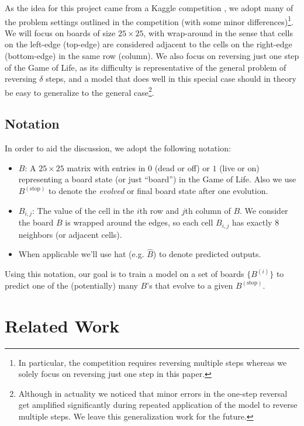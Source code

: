 \documentclass[conference]{IEEEtran}
\begin{document}
As the idea for this project came from a Kaggle competition \cite{b1}, we adopt many of the problem settings outlined in the competition (with some minor differences)\footnote{In particular, the competition requires reversing multiple steps whereas we solely focus on reversing just one step in this paper.}. We will focus on boards of size $25 \times 25$, with wrap-around in the sense that cells on the left-edge (top-edge) are considered adjacent to the cells on the right-edge (bottom-edge) in the same row (column). We also focus on reversing just one step of the Game of Life, as its difficulty is representative of the general problem of reversing $\delta$ steps, and a model that does well in this special case should in theory be easy to generalize to the general case\footnote{Although in actuality we noticed that minor errors in the one-step reversal get amplified significantly during repeated application of the model to reverse multiple steps. We leave this generalization work for the future.}.

\subsection{Notation}
In order to aid the discussion, we adopt the following notation:

\begin{itemize}
    \item $B$: A $25 \times 25$ matrix with entries in $0$ (dead or off) or $1$ (live or on) representing a board state (or just ``board'') in the Game of Life. Also we use $B^{(\mathrm{stop})}$ to denote the \emph{evolved} or final board state after one evolution.
    \item $B_{i,j}$: The value of the cell in the $i$th row and $j$th column of $B$. We consider the board $B$ is wrapped around the edges, so each cell $B_{i, j}$ has exactly 8 neighbors (or adjacent cells). 
    \item When applicable we'll use hat (e.g. $\hat B$) to denote predicted outputs.
\end{itemize}

Using this notation, our goal is to train a model on a set of boards $\{B^{(i)}\}$ to predict one of the (potentially) many $B$'s that evolve to a given $B^{(\mathrm{stop})}$.

\section{Related Work}
\end{document}
